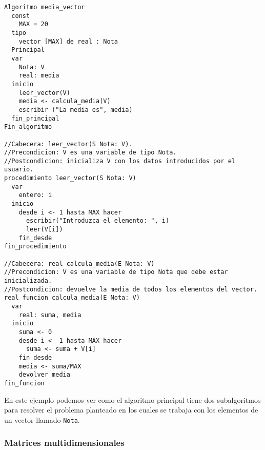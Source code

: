 \documentclass[12pt,letterpaper]{article}
\begin{document}
\begin{lstlisting}
Algoritmo media_vector
  const
    MAX = 20
  tipo
    vector [MAX] de real : Nota
  Principal
  var
    Nota: V
    real: media
  inicio
    leer_vector(V)
    media <- calcula_media(V)
    escribir ("La media es", media)
  fin_principal
Fin_algoritmo
	
//Cabecera: leer_vector(S Nota: V).
//Precondicion: V es una variable de tipo Nota.
//Postcondicion: inicializa V con los datos introducidos por el usuario.
procedimiento leer_vector(S Nota: V)
  var
    entero: i
  inicio
    desde i <- 1 hasta MAX hacer
      escribir("Introduzca el elemento: ", i)
      leer(V[i])
    fin_desde
fin_procedimiento
	
//Cabecera: real calcula_media(E Nota: V)
//Precondicion: V es una variable de tipo Nota que debe estar inicializada.
//Postcondicion: devuelve la media de todos los elementos del vector.
real funcion calcula_media(E Nota: V)
  var
    real: suma, media
  inicio
    suma <- 0
    desde i <- 1 hasta MAX hacer
      suma <- suma + V[i]
    fin_desde
    media <- suma/MAX
    devolver media
fin_funcion
\end{lstlisting}
En este ejemplo podemos ver como el algoritmo principal tiene dos subalgoritmos para resolver el problema planteado en los cuales se trabaja con los elementos de un vector llamado \texttt{Nota}.

\subsubsection{Matrices multidimensionales}
\end{document}
